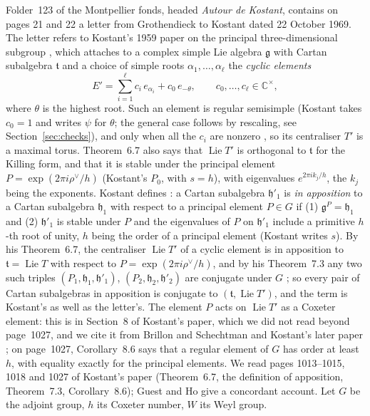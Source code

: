 \documentclass[11pt,a4paper]{amsart}
\theoremstyle{definition}
\theoremstyle{remark}
\newcommand{\C}{\mathbb C}
\begin{document}
Folder~123 of the Montpellier fonds, headed \emph{Autour de Kostant}, contains on pages 21 and 22 a letter from Grothendieck to Kostant dated 22 October 1969. The letter refers to Kostant's 1959 paper on the principal three-dimensional subgroup \cite{kostant}, which attaches to a complex simple Lie algebra $\mathfrak g$ with Cartan subalgebra $\mathfrak t$ and a choice of simple roots $\alpha_1,\dots,\alpha_\ell$ the \emph{cyclic elements}
\[
E' = \sum_{i=1}^{\ell} c_i\, e_{\alpha_i} + c_0\, e_{-\theta}, \qquad c_0,\dots,c_\ell \in \C^{\times},
\]
where $\theta$ is the highest root. Such an element is regular semisimple \cite[Thm~6.7]{kostant} (Kostant takes $c_0 = 1$ and writes $\psi$ for $\theta$; the general case follows by rescaling, see Section~\ref{sec:checks}), and only when all the $c_i$ are nonzero \cite[Thm~1.2]{kostant2010}, so its centraliser $T'$ is a maximal torus. Theorem~6.7 also says that $\operatorname{Lie}T'$ is orthogonal to $\mathfrak t$ for the Killing form, and that it is stable under the principal element $P = \exp(2\pi i\rho^\vee/h)$ (Kostant's $P_0$, with $s = h$), with eigenvalues $e^{2\pi i k_j/h}$, the $k_j$ being the exponents. Kostant defines \cite[p.~1018]{kostant}: a Cartan subalgebra $\mathfrak h'_1$ is \emph{in apposition} to a Cartan subalgebra $\mathfrak h_1$ with respect to a principal element $P \in G$ if (1) $\mathfrak g^P = \mathfrak h_1$ and (2) $\mathfrak h'_1$ is stable under $P$ and the eigenvalues of $P$ on $\mathfrak h'_1$ include a primitive $h$-th root of unity, $h$ being the order of a principal element (Kostant writes $s$). By his Theorem~6.7, the centraliser $\operatorname{Lie}T'$ of a cyclic element is in apposition to $\mathfrak t = \operatorname{Lie}T$ with respect to $P = \exp(2\pi i\rho^\vee/h)$, and by his Theorem~7.3 any two such triples $(P_1, \mathfrak h_1, \mathfrak h'_1)$, $(P_2, \mathfrak h_2, \mathfrak h'_2)$ are conjugate under $G$ \cite[p.~1018]{kostant}; so every pair of Cartan subalgebras in apposition is conjugate to $(\mathfrak t, \operatorname{Lie}T')$, and the term is Kostant's as well as the letter's. The element $P$ acts on $\operatorname{Lie}T'$ as a Coxeter element: this is in Section~8 of Kostant's paper, which we did not read beyond page~1027, and we cite it from Brillon and Schechtman \cite[Thm~1.4]{brillon} and Kostant's later paper \cite[Thm~1.3]{kostant2010}; on page~1027, Corollary~8.6 says that a regular element of $G$ has order at least $h$, with equality exactly for the principal elements. We read pages 1013--1015, 1018 and 1027 of Kostant's paper (Theorem~6.7, the definition of apposition, Theorem~7.3, Corollary~8.6); Guest and Ho \cite[\S3--5]{guestho} give a concordant account. Let $G$ be the adjoint group, $h$ its Coxeter number, $W$ its Weyl group.
\end{document}
